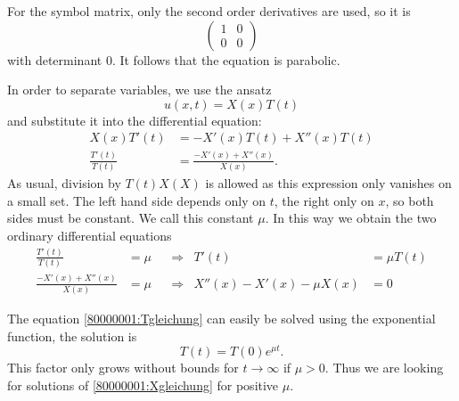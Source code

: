 \begin{loesung}
\begin{teilaufgaben}
\item
For the symbol matrix, only the second order derivatives are
used, so it is
\[
\begin{pmatrix}
1&0\\
0&0
\end{pmatrix}
\]
with determinant $0$.
It follows that the equation is parabolic.
\item
In order to separate variables, we use the ansatz
\[
u(x,t)=X(x)T(t)
\]
and substitute it into the differential equation:
\begin{align*}
X(x)T'(t)&=-X'(x)T(t)+X''(x)T(t)\\
\frac{T'(t)}{T(t)}&=\frac{-X'(x)+X''(x)}{X(x)}.
\end{align*}
As usual, division by $T(t)X(X)$ is allowed as this expression only
vanishes on a small set.
The left hand side depends only on $t$, the right only on $x$, so both
sides must be constant.
We call this constant $\mu$.
In this way we obtain the two ordinary differential equations
\begin{align}
\frac{T'(t)}{T(t)}&=\mu&&\Rightarrow&T'(t)&=\mu T(t)
\label{80000001:Tgleichung}
\\
\frac{-X'(x)+X''(x)}{X(x)}&=\mu&&\Rightarrow&X''(x)-X'(x)-\mu X(x)&=0
\label{80000001:Xgleichung}
\end{align}
\item
The equation
\eqref{80000001:Tgleichung}
can easily be solved using the exponential function, the solution is
\[
T(t)=T(0)e^{\mu t}.
\]
This factor only grows without bounds for $t\to\infty$ if $\mu>0$.
Thus we are looking for solutions of \eqref{80000001:Xgleichung} for
positive $\mu$.


\end{teilaufgaben}
\end{loesung}
